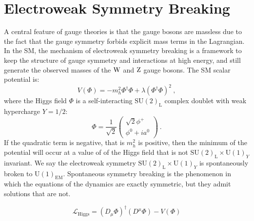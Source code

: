 \section{Electroweak Symmetry Breaking}
A central feature of gauge theories is that the gauge bosons are
massless due to the fact that the gauge symmetry forbids explicit mass
terms in the Lagrangian. In the SM, the mechanism of electroweak symmetry breaking
is a framework to keep the structure of gauge symmetry and
interactions at high energy, and still generate the observed masses
of the $\mathrm{W}$ and $\mathrm{Z}$ gauge bosons. The SM scalar potential is:
\begin{equation}
V(\Phi) = -m_h^2\Phi^{\dagger}\Phi + \lambda(\Phi^{\dagger}\Phi)^2~,
\end{equation}
where the Higgs field $\Phi$ is a self-interacting
$\mathrm{SU(2)}_{\mathrm{L}}$ complex doublet with weak hypercharge $Y=1/2$:
\begin{equation}
\Phi = \frac{1}{\sqrt{2}}\left(\begin{matrix} \sqrt{2}\phi^{+}\\\phi^0+ia^0\end{matrix} \right)~.
\end{equation}
If the quadratic term is negative, that is $m_h^2$ is positive, then
the minimum of the potential will occur at a value of of the Higgs
field that is not $\mathrm{SU(2)}_{\mathrm{L}}\times\mathrm{U(1)}_Y$ invariant.
We say the electroweak symmetry
$\mathrm{SU(2)}_{\mathrm{L}}\times\mathrm{U(1)}_Y$ is spontaneously
broken to $\mathrm{U(1)}_{\mathrm{EM}}$. Spontaneous symmetry breaking
is the phenomenon in which the equations of the dynamics are
exactly symmetric, but they admit solutions that are not.

\begin{equation}
\mathcal L_{\mathrm{Higgs}} = (D_{\mu}\Phi)^{\dagger}(D^{\mu}\Phi) - V(\Phi)
\end{equation}
